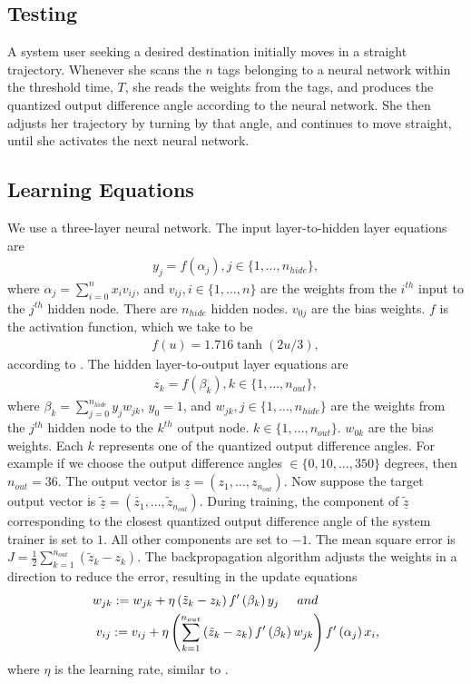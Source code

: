 \documentclass[conference]{IEEEtran}
\begin{document}
\subsection{Testing}
A system user seeking a desired destination initially moves in a straight trajectory. Whenever she scans the $n$ tags belonging to a neural network within the threshold time, $T$, she reads the weights from the tags, and produces the quantized output difference angle according to the neural network. She then adjusts her trajectory by turning by that angle, and continues to move straight, until she activates the next neural network.
\subsection{Learning Equations}
We use a three-layer neural network. The input layer-to-hidden layer equations are
\begin{eqnarray}
y_j = f \left(\alpha_j\right), j \in \{1, \ldots, n_{hide}\},
\end{eqnarray}
where $\alpha_j = \sum_{i=0}^n x_i v_{ij}$, and $v_{ij}, i \in \{1, \ldots, n\}$ are the weights from the $i^{th}$ input to the $j^{th}$ hidden node. There are $n_{hide}$ hidden nodes. $v_{0j}$ are the bias weights. $f$ is the activation function, which we take to be
\begin{eqnarray}
f\left(u\right) = 1.716 \tanh \left( 2u/3\right),
\end{eqnarray}
according to \cite{2001Duda}. The hidden layer-to-output layer equations are
\begin{eqnarray}
z_k = f \left( \beta_k \right), k \in \{1, \ldots, n_{out}\}, 
\end{eqnarray}
where $\beta_k = \sum_{j=0}^{n_{hide}} y_j w_{jk}$, $y_0 = 1$, and $w_{jk}, j \in \{1, \ldots, n_{hide} \}$ are the weights from the $j^{th}$ hidden node to the $k^{th}$ output node. $k \in \{1, \ldots, n_{out}\}$. $w_{0k}$ are the bias weights. Each $k$ represents one of the quantized output difference angles. For example if we choose the output difference angles $\in \{0, 10, \ldots, 350\}$ degrees, then $n_{out} = 36$. The output vector is $\underline{z} = \left(z_1, \ldots, z_{n_{out}}\right)$. Now suppose the target output vector is $\underline{\tilde{z}} = \left(\tilde{z_1}, \ldots, \tilde{z}_{n_{out}}\right)$. During training, the component of $\underline{\tilde{z}}$ corresponding to the closest quantized output difference angle of the system trainer is set to $1$. All other components are set to $-1$. The mean square error is $J = \frac{1}{2} \sum_{k=1}^{n_{out}} \left( \tilde{z}_k - z_k \right)$. The backpropagation algorithm adjusts the weights in a direction to reduce the error, resulting in the update equations
\begin{eqnarray}
w_{jk} := w_{jk} + \eta \left(\tilde{z}_k - z_k \right) f'\left(\beta_k\right) y_j \hspace{0.5cm} \mbox{and} \hspace{1.7cm} \\
v_{ij} := v_{ij} + 
\eta \left( \sum_{k=1}^{n_{out}} \left(\tilde{z}_k - z_k\right)f'\left(\beta_k\right)w_{jk}\right) f'\left(\alpha_j \right) x_i,
\end{eqnarray}
where $\eta$ is the learning rate, similar to \cite{2001Duda}.
\end{document}

